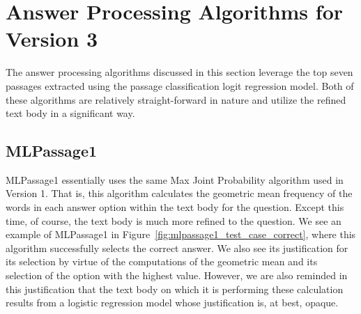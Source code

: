 \section{Answer Processing Algorithms for Version 3}

The answer processing algorithms discussed in this section leverage the top seven passages extracted using the passage classification logit regression model.  Both of these algorithms are relatively straight-forward in nature and utilize the refined text body in a significant way.  




		

		
\subsection{MLPassage1}

MLPassage1 essentially uses the same Max Joint Probability algorithm used in Version 1.  That is, this algorithm calculates the geometric mean frequency of the words in each answer option within the text body for the question.  Except this time, of course, the text body is much more refined to the question.  We see an example of MLPassage1 in Figure~\ref{fig:mlpassage1_test_case_correct}, where this algorithm successfully selects the correct answer.  We also see its justification for its selection by virtue of the computations of the geometric mean and its selection of the option with the highest value.  However, we are also reminded in this justification that the text body on which it is performing these calculation results from a logistic regression model whose justification is, at best, opaque.  



